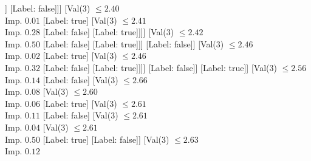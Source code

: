 \documentclass[margin=10pt]{standalone}
\begin{document}
\begin{forest}
															[Val($3$) $ \leq 2.47$ \\ Imp. $0.08$
																[Val($3$) $ \leq 2.43$ \\ Imp. $0.02$
																	[Val($3$) $ \leq 2.42$ \\ Imp. $0.14$
																		[Val($3$) $ \leq 2.42$ \\ Imp. $0.02$
																			[Val($3$) $ \leq 2.39$ \\ Imp. $0.02$
																				[Val($3$) $ \leq 2.39$ \\ Imp. $0.22$
																					[Label: true]
																					[Val($3$) $ \leq 2.39$ \\ Imp. $0.11$
																						[Val($3$) $ \leq 2.39$ \\ Imp. $0.50$
																							[Label: false]
																							[Label: true]]
																						[Label: false]]]
																				[Val($3$) $ \leq 2.40$ \\ Imp. $0.01$
																					[Label: true]
																					[Val($3$) $ \leq 2.41$ \\ Imp. $0.28$
																						[Label: false]
																						[Label: true]]]]
																			[Val($3$) $ \leq 2.42$ \\ Imp. $0.50$
																				[Label: false]
																				[Label: true]]]
																		[Label: false]]
																	[Val($3$) $ \leq 2.46$ \\ Imp. $0.02$
																		[Label: true]
																		[Val($3$) $ \leq 2.46$ \\ Imp. $0.32$
																			[Label: false]
																			[Label: true]]]]
																[Label: false]]
															[Label: true]]
														[Val($3$) $ \leq 2.56$ \\ Imp. $0.14$
															[Label: false]
															[Val($3$) $ \leq 2.66$ \\ Imp. $0.08$
																[Val($3$) $ \leq 2.60$ \\ Imp. $0.06$
																	[Label: true]
																	[Val($3$) $ \leq 2.61$ \\ Imp. $0.11$
																		[Label: false]
																		[Val($3$) $ \leq 2.61$ \\ Imp. $0.04$
																			[Val($3$) $ \leq 2.61$ \\ Imp. $0.50$
																				[Label: true]
																				[Label: false]]
																			[Val($3$) $ \leq 2.63$ \\ Imp. $0.12$

\end{forest}
\end{document}
